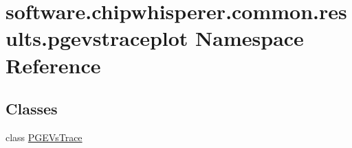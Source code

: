\hypertarget{namespacesoftware_1_1chipwhisperer_1_1common_1_1results_1_1pgevstraceplot}{}\section{software.\+chipwhisperer.\+common.\+results.\+pgevstraceplot Namespace Reference}
\label{namespacesoftware_1_1chipwhisperer_1_1common_1_1results_1_1pgevstraceplot}
\subsection*{Classes}
\begin{DoxyCompactItemize}
\item 
class \hyperlink{classsoftware_1_1chipwhisperer_1_1common_1_1results_1_1pgevstraceplot_1_1PGEVsTrace}{P\+G\+E\+Vs\+Trace}
\end{DoxyCompactItemize}
